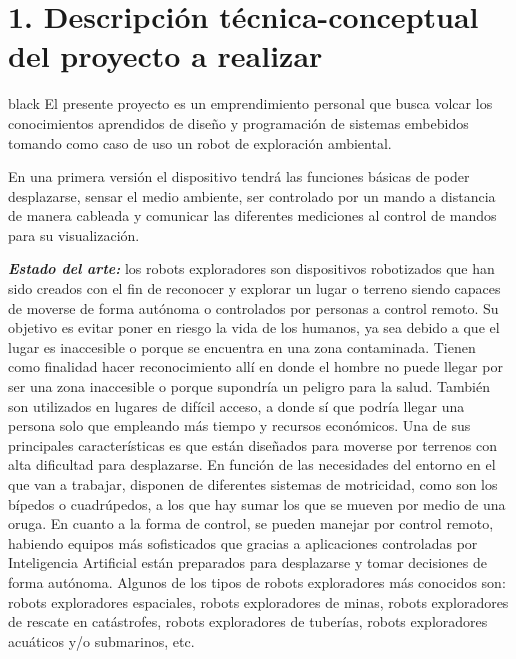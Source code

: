 \documentclass[
11pt, %
]{charter}
\begin{document}
\section{1. Descripción técnica-conceptual del proyecto a realizar}
\label{sec:descripcion}

\begin{consigna}{black} %
El presente proyecto es un emprendimiento personal que busca volcar los conocimientos aprendidos de diseño y programación de sistemas embebidos tomando como caso de uso un robot de exploración ambiental. 

En una primera versión el dispositivo tendrá las funciones básicas de poder desplazarse, sensar el medio ambiente, ser controlado por un mando a distancia de manera cableada y comunicar las diferentes mediciones al control de mandos para su visualización.


\textit{\textbf{Estado del arte:}}
los robots exploradores son dispositivos robotizados que han sido creados con el fin de reconocer y explorar un lugar o terreno siendo capaces de moverse de forma autónoma o controlados por personas a control remoto. Su objetivo es evitar poner en riesgo la vida de los humanos, ya sea debido a que el lugar es inaccesible o porque se encuentra en una zona contaminada.
Tienen como finalidad hacer reconocimiento allí en donde el hombre no puede llegar por ser una zona inaccesible o porque supondría un peligro para la salud. También son utilizados en lugares de difícil acceso, a donde sí que podría llegar una persona solo que empleando más tiempo y recursos económicos.
Una de sus principales características es que están diseñados para moverse por terrenos con alta dificultad para desplazarse. En función de las necesidades del entorno en el que van a trabajar, disponen de diferentes sistemas de motricidad, como son los bípedos o cuadrúpedos, a los que hay sumar los que se mueven por medio de una oruga.
En cuanto a la forma de control, se pueden manejar por control remoto, habiendo equipos más sofisticados que gracias a aplicaciones controladas por Inteligencia Artificial están preparados para desplazarse y tomar decisiones de forma autónoma.
Algunos de los tipos de robots exploradores más conocidos son: robots exploradores espaciales, robots exploradores de minas, robots exploradores de rescate en catástrofes, robots exploradores de tuberías, robots exploradores acuáticos y/o submarinos, etc.


\end{consigna}
\end{document}
